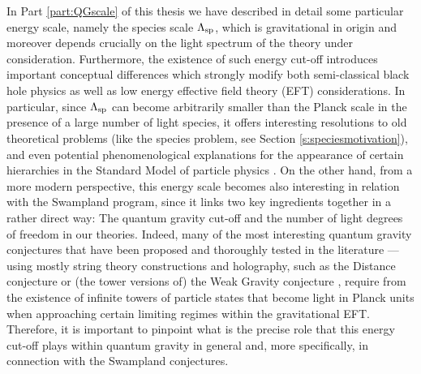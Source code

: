 
In Part \ref{part:QGscale} of this thesis we have described in detail some particular energy scale, namely the species scale $\Lambda_{\text{sp}}$, which is gravitational in origin and moreover depends crucially on the light spectrum of the theory under consideration. Furthermore, the existence of such energy cut-off introduces important conceptual differences which strongly modify both semi-classical black hole physics as well as low energy effective field theory (EFT) considerations. In particular, since $\Lambda_{\text{sp}}$ can become arbitrarily smaller than the Planck scale in the presence of a large number of light species, it offers interesting resolutions to old theoretical problems (like the species problem, see Section \ref{s:speciesmotivation}), and even potential phenomenological explanations for the appearance of certain hierarchies in the Standard Model of particle physics \cite{Dvali:2007hz,Dvali:2007iv, Castellano:2023qhp}. On the other hand, from a more modern perspective, this energy scale becomes also interesting in relation with the Swampland program, since it links two key ingredients together in a rather direct way: The quantum gravity cut-off and the number of light degrees of freedom in our theories. Indeed, many of the most interesting quantum gravity conjectures that have been proposed and thoroughly tested in the literature --- using mostly string theory constructions and holography, such as the Distance conjecture \cite{Ooguri:2006in} or (the tower versions of) the Weak Gravity conjecture \cite{Arkani-Hamed:2006emk,Heidenreich:2016aqi,Andriolo:2018lvp,Montero:2016tif}, require from the existence of infinite towers of particle states that become light in Planck units when approaching certain limiting regimes within the gravitational EFT. Therefore, it is important to pinpoint what is the precise role that this energy cut-off plays within quantum gravity in general and, more specifically, in connection with the Swampland conjectures.

